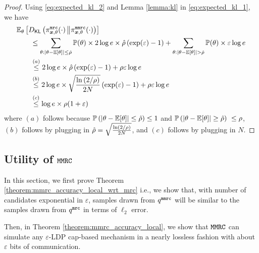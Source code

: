 \begin{proof}
Using \eqref{eq:expected_kl_2} and Lemma \ref{lemma:kl} in \eqref{eq:expected_kl_1}, we have
\begin{align}
 & \mathbb{E}_{\theta}\left[{D}_{\mathsf{KL}}\left( \pi^{\texttt{mrc}}_{{\boldsymbol{x}}, \theta}(\cdot)\, \middle\Vert \pi^{\texttt{mmrc}}_{{\boldsymbol{x}}, \theta}(\cdot) \right)\right] \\
 & \qquad \leq \sum_{\theta : \left\lvert \theta- \mathbb{E}[\theta] \right\rvert \leq \hat{\rho}} \mathbb{P}(\theta) \times 2\log e \times \hat{\rho} \left( \exp(\varepsilon) - 1 \right) +  \sum_{\theta : \left\lvert \theta- \mathbb{E}[\theta] \right\rvert > \hat{\rho}} \mathbb{P}(\theta) \times \varepsilon \log e \\
 & \qquad \stackrel{(a)}{\leq} 2 \log e \times \hat{\rho} \left( \exp(\varepsilon) - 1 \right) + \rho \varepsilon \log e
 \label{eq:expected_kl_3} \\
  & \qquad \stackrel{(b)}{\leq} 2 \log e \times \sqrt{\dfrac{\ln\left( 2/\rho \right)}{2N}} \left( \exp(\varepsilon) - 1 \right) + \rho \varepsilon \log e\\
  & \qquad \stackrel{(c)}{\leq} \log e \times \rho (1+\varepsilon)
\end{align}
where $(a)$ follows because $\mathbb{P} \left(\left\lvert \theta- \mathbb{E}[\theta] \right\rvert \leq \hat{\rho}\right) \leq 1$ and $\mathbb{P}\left(\left\lvert \theta- \mathbb{E}[\theta] \right\rvert \geq \hat{\rho}\right)\ \leq \rho$, $(b)$ follows by plugging in $\hat{\rho} = \sqrt{\frac{\ln\left( 2/\rho \right)}{2N}}$, and $(c)$ follows by plugging in $N$.
\end{proof}

\subsection{Utility of \texorpdfstring{$\texttt{MMRC}$}{MMRC}}\label{appendix:utility_mmrc}

In this section, we first prove Theorem \ref{theorem:mmrc_accuracy_local_wrt_mrc} i.e., we show that, with number of candidates exponential in $\varepsilon$, samples drawn from $q^{\texttt{mmrc}}$ will be similar to the samples drawn from $q^{\texttt{mrc}}$ in terms of $\ell_2$ error.

Then, in Theorem \ref{theorem:mmrc_accuracy_local}, we show that $\texttt{MMRC}$ can simulate any $\varepsilon$-LDP cap-based mechanism in a nearly lossless fashion with about $\varepsilon$ bits of communication. 



